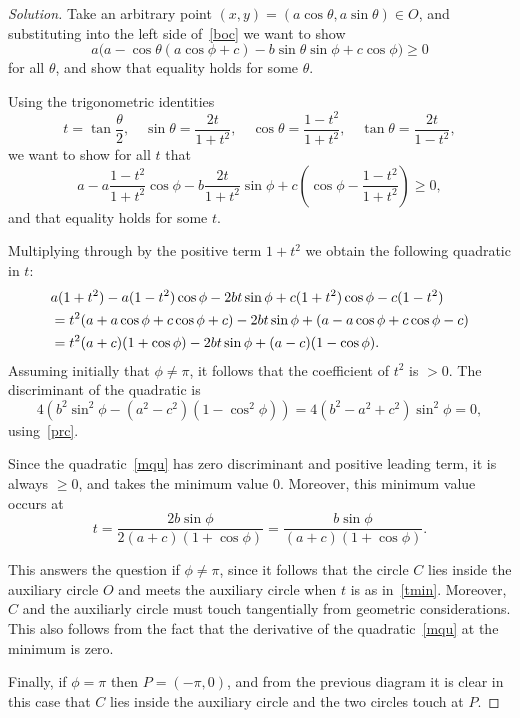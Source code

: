 \documentclass[11pt,a4paper]{report}
\theoremstyle{plain}
\theoremstyle{definition}
\begin{document}
\begin{proof}[Solution]
Take an arbitrary point $ (x,y) = (a\cos\theta , a \sin\theta ) \in O $, and substituting into the left side of~\eqref{boc} we want to show 
\begin{equation} \label{sthmin} 
a\big( a -   \cos \theta ( a \cos\phi +c) -  b \sin\theta \sin\phi + c \cos\phi \big) \geq 0 
\end{equation} 
for all $ \theta$, and show that equality holds for some $ \theta $.


\medskip
Using the trigonometric identities 
\begin{equation} \label{tids}
t = \tan \frac{\theta}{2}, \quad \sin\theta = \frac{2t}{1+t^2} , \quad \cos\theta = \frac{1-t^2 }{1+t^2 } , \quad \tan\theta = \frac{2t}{1-t^2 } ,
\end{equation} 
we want to show  for all $ t $ that 
\begin{equation} \label{} 
a - a  \frac{1-t^2 }{1+t^2 }\cos\phi - b \frac{2t}{1+t^2}\sin\phi + c \left( \cos\phi - \frac{1-t^2 }{1+t^2 }\right) \geq 0 ,
\end{equation} 
and that equality holds for some $ t $.

Multiplying  through by the positive term $ 1+t^2 $ we obtain the following quadratic in $ t  $:
\begin{align}
&a(1+t^2) -a(1-t^2)\cos\phi -2bt\sin\phi + c(1+t^2)\cos\phi - c(1-t^2)  \notag\\
&= t^2(a+a\cos\phi + c \cos\phi +c) -2bt \sin\phi + (a-a\cos\phi +c\cos\phi - c) \notag\\
&= t^2(a+c)(1+\cos\phi) -2bt \sin\phi  + (a-c)(1-\cos\phi).   \label{mqu}
\end{align}
Assuming initially that $ \phi \neq \pi$, it follows that the coefficient of $ t^2 $ is $ > 0 $.  The discriminant of the quadratic is
\begin{equation} \label{} 
4 \left( b^2\sin^2 \phi -(a^2-c^2)(1-\cos^2 \phi) \right) = 4 (b^2-a^2 + c^2 )\sin^2 \phi =0,
\end{equation} 
using~\eqref{prc}.

Since the quadratic~\eqref{mqu} has zero discriminant and positive leading term, it is always $ \geq 0 $, and takes the minimum value $ 0 $. Moreover, this minimum value occurs at 
\begin{equation} \label{tmin}
t = \frac{2b\sin\phi}{ 2(a+c)(1+\cos\phi) } = \frac{ b\sin\phi}{  (a+c)(1+\cos\phi) }.
\end{equation} 

This answers the question if $ \phi \neq \pi $, since it follows that the circle $ C $ lies inside the auxiliary circle $ O $ and meets the auxiliary circle  when $ t $ is as in~\eqref{tmin}.  Moreover, $ C $ and the auxiliarly circle  must touch tangentially from geometric considerations.  This also follows from the fact that the derivative of the quadratic~\eqref{mqu} at  the minimum is zero.

Finally, if $ \phi =\pi $ then $ P = (-\pi, 0) $, and from the previous diagram it is clear in this case that $ C $ lies inside the auxiliary circle and the two circles touch at $ P $.
\end{proof}
\end{document}
